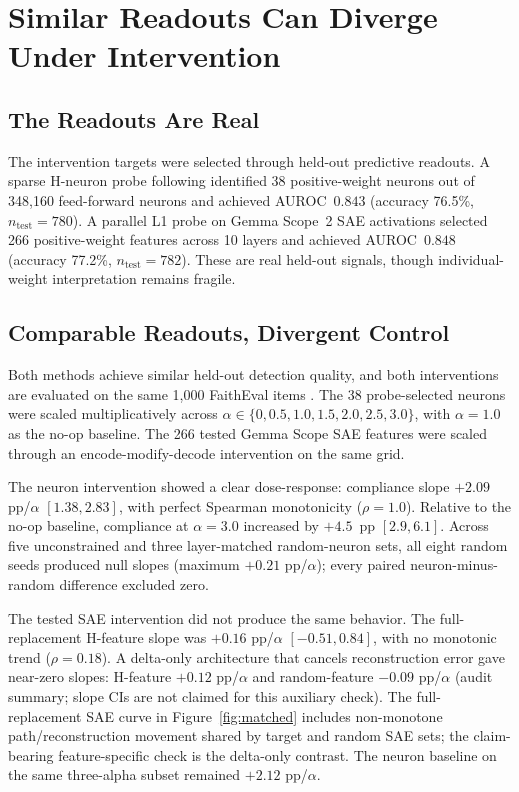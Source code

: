 \documentclass{article}
\begin{document}
\section{Similar Readouts Can Diverge Under Intervention}
\label{sec:localization}

\subsection{The Readouts Are Real}

The intervention targets were selected through held-out predictive readouts.
A sparse H-neuron probe following \citet{gao2025hneurons} identified 38 positive-weight neurons out of 348,160 feed-forward neurons and achieved AUROC~$0.843$ (accuracy 76.5\%, $n_{\text{test}} = 780$).
A parallel L1 probe on Gemma Scope~2 SAE activations \citep{lieberum2024gemmascope} selected 266 positive-weight features across 10 layers and achieved AUROC~$0.848$ (accuracy 77.2\%, $n_{\text{test}} = 782$).
These are real held-out signals, though individual-weight interpretation remains fragile.

\subsection{Comparable Readouts, Divergent Control}

Both methods achieve similar held-out detection quality, and both interventions are evaluated on the same 1,000 FaithEval items \citep{ming2025faitheval}.
The 38 probe-selected neurons were scaled multiplicatively across $\alpha \in \{0, 0.5, 1.0, 1.5, 2.0, 2.5, 3.0\}$, with $\alpha = 1.0$ as the no-op baseline.
The 266 tested Gemma Scope SAE features were scaled through an encode-modify-decode intervention on the same grid.

The neuron intervention showed a clear dose-response: compliance slope $+2.09$ pp/$\alpha$ $[1.38, 2.83]$, with perfect Spearman monotonicity ($\rho = 1.0$).
Relative to the no-op baseline, compliance at $\alpha = 3.0$ increased by $+4.5$~pp $[2.9, 6.1]$.
Across five unconstrained and three layer-matched random-neuron sets, all eight random seeds produced null slopes (maximum $+0.21$ pp/$\alpha$); every paired neuron-minus-random difference excluded zero.

The tested SAE intervention did not produce the same behavior.
The full-replacement H-feature slope was $+0.16$ pp/$\alpha$ $[-0.51, 0.84]$, with no monotonic trend ($\rho = 0.18$).
A delta-only architecture that cancels reconstruction error gave near-zero slopes: H-feature $+0.12$ pp/$\alpha$ and random-feature $-0.09$ pp/$\alpha$ (audit summary; slope CIs are not claimed for this auxiliary check).
The full-replacement SAE curve in Figure~\ref{fig:matched} includes non-monotone path/reconstruction movement shared by target and random SAE sets; the claim-bearing feature-specific check is the delta-only contrast.
The neuron baseline on the same three-alpha subset remained $+2.12$ pp/$\alpha$.
\end{document}
